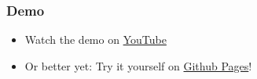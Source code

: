 \begin{frame}
    \frametitle{Demo}
    \begin{itemize}
        \large
        \item Watch the demo on \href{https://www.youtube.com/watch?v=9lhHlBe-INc}{YouTube}
        \item Or better yet: Try it yourself on \href{https://decibel-threshold-event-displayer.github.io}{Github Pages}!
    \end{itemize}    
\end{frame}